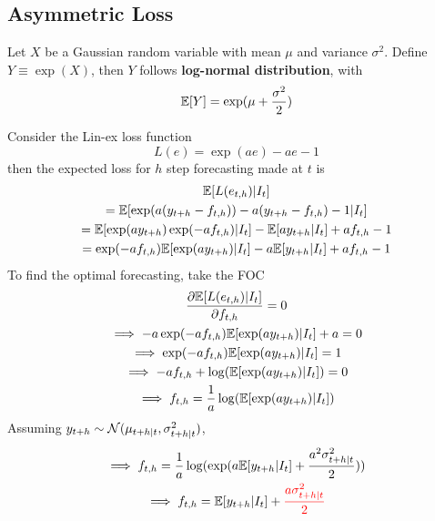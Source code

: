 \documentclass[11pt]{article}
\begin{document}
		\subsection{Asymmetric Loss}
			\begin{definition}
				Let $X$ be a Gaussian random variable with mean $\mu$ and variance $\sigma^2$. Define $Y \equiv \exp(X)$, then $Y$ follows \textbf{log-normal distribution}, with 
				\begin{equation}
					\mathbb{E}[{Y}] = \exp(\mu + \frac{\sigma^2}{2})
				\end{equation}
			\end{definition}
			
			\begin{example}
				Consider the Lin-ex loss function
				\begin{equation}
					L(e) = \exp(ae) - ae - 1
				\end{equation}
				then the expected loss for $h$ step forecasting made at $t$ is 
				\begin{gather}
					\mathbb{E}[{L(e_{t,h})|I_t}] \\
					= \mathbb{E}[{\exp(a(y_{t+h} - f_{t,h})) - a(y_{t+h} - f_{t,h}) - 1|I_t}] \\
					= \mathbb{E}[{\exp(a y_{t+h}) \exp(-a f_{t,h})|I_t}] - \mathbb{E}[{a y_{t+h}|I_t}] + a f_{t,h} - 1 \\ 
					= \exp(-a f_{t,h}) \mathbb{E}[{\exp(a y_{t+h})|I_t}] - a \mathbb{E}[{y_{t+h}|I_t}] + a f_{t,h} - 1 \\
				\end{gather}
				To find the optimal forecasting, take the FOC
				\begin{gather}
					\frac{\partial{\mathbb{E}[{L(e_{t,h})|I_t}]}}{\partial{f_{t,h}}} = 0\\
					\implies -a \exp(-a f_{t,h}) \mathbb{E}[{\exp(a y_{t+h})|I_t}] + a = 0 \\
					\implies \exp(-a f_{t, h}) \mathbb{E}[{\exp(a y_{t+h})|I_t}] = 1 \\
					\implies - a f_{t, h} + \log(\mathbb{E}[{\exp(a y_{t+h})|I_t}]) = 0 \\
					\implies f_{t, h} = \frac{1}{a} \log(\mathbb{E}[{\exp(a y_{t+h})|I_t}])
				\end{gather}
				Assuming $y_{t+h} \sim \mathcal{{N}}(\mu_{t+h|t}, \sigma_{t+h|t}^2)$, 
				\begin{gather}
					\implies f_{t, h} = \frac{1}{a} \log(\exp(
						a \expect{y_{t+h}|I_t} + \frac{a^2 \sigma_{t+h|t}^2}{2}
					)) \\
					\implies f_{t, h} = \expect{y_{t+h}|I_t} + \red{\frac{a \sigma^2_{t+h|t}}{2}}

\end{gather}
\end{example}
\end{document}
